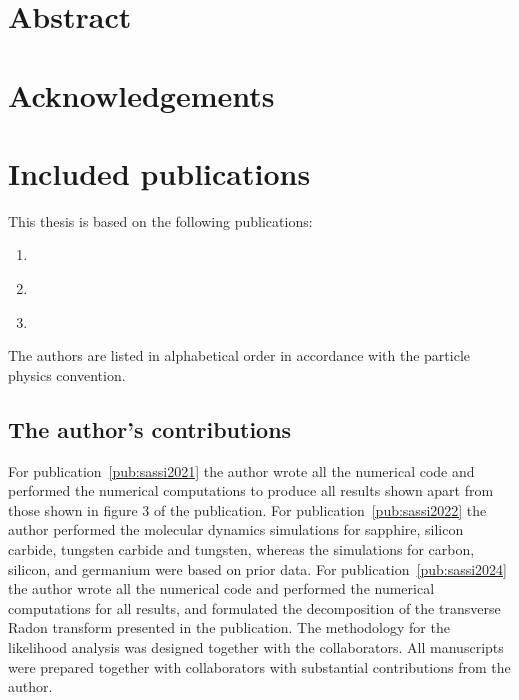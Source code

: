 \documentclass[b5paper, 10pt, twoside]{book}
\begin{document}

\tableofcontents

\chapter{Abstract}

\chapter{Acknowledgements}





\chapter{Included publications}

This thesis is based on the following publications:
\begin{enumerate}[label=\Roman*,ref=\Roman*]
\item\label{pub:sassi2021} 
\item\label{pub:sassi2022} 
\item\label{pub:sassi2024} 
\end{enumerate}
The authors are listed in alphabetical order in accordance with the particle physics convention.

\section*{The author's contributions}

For publication~\ref{pub:sassi2021} the author wrote all the numerical code and performed the numerical computations to produce all results shown apart from those shown in figure 3 of the publication. For publication~\ref{pub:sassi2022} the author performed the molecular dynamics simulations for sapphire, silicon carbide, tungsten carbide and tungsten, whereas the simulations for carbon, silicon, and germanium were based on prior data. For publication~\ref{pub:sassi2024} the author wrote all the numerical code and performed the numerical computations for all results, and formulated the decomposition of the transverse Radon transform presented in the publication. The methodology for the likelihood analysis was designed together with the collaborators. All manuscripts were prepared together with collaborators with substantial contributions from the author.
\end{document}
